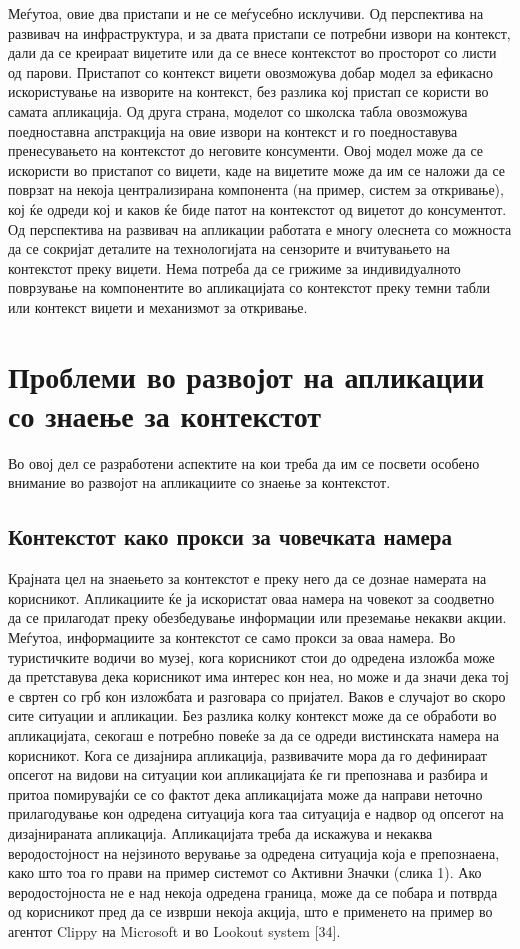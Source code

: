 Меѓутоа, овие два пристапи и не се меѓусебно исклучиви. Од перспектива на
развивач на инфраструктура, и за двата пристапи се потребни извори на контекст,
дали да се креираат виџетите или да се внесе контекстот во просторот со листи од
парови. Пристапот со контекст виџети овозможува добар модел за ефикасно
искористување на изворите на контекст, без разлика кој пристап се користи во
самата апликација. Од друга страна, моделот со школска табла овозможува
поедноставна апстракција на овие извори на контекст и го поедноставува
пренесувањето на контекстот до неговите консументи. Овој модел може да се
искористи во пристапот со виџети, каде на виџетите може да им се наложи да се
поврзат на некоја централизирана компонента (на пример, систем за откривање),
кој ќе одреди кој и каков ќе биде патот на контекстот од виџетот до консументот.
Од перспектива на развивач на апликации работата е многу олеснета со можноста да
се сокријат деталите на технологијата на сензорите и вчитувањето на контекстот
преку виџети. Нема потреба да се грижиме за индивидуалното поврзување на
компонентите во апликацијата со контекстот преку темни табли или контекст виџети
и механизмот за откривање.

\section{Проблеми во развојот на апликации со знаење за контекстот} 

Во овој дел се разработени аспектите на кои треба да им се посвети особено
внимание во развојот на апликациите со знаење за контекстот. 

\subsection{Контекстот како прокси за човечката намера}

Крајната цел на знаењето за контекстот е преку него да се дознае намерата на
корисникот. Апликациите ќе ја искористат оваа намера на човекот за соодветно да
се прилагодат преку обезбедување информации или преземање некакви акции.
Меѓутоа, информациите за контекстот се само прокси за оваа намера. Во
туристичките водичи во музеј, кога корисникот стои до одредена изложба може да
претставува дека корисникот има интерес кон неа, но може и да значи дека тој е
свртен со грб кон изложбата и разговара со пријател. Ваков е случајот во скоро
сите ситуации и апликации. Без разлика колку контекст може да се обработи во
апликацијата, секогаш е потребно повеќе за да се одреди вистинската намера на
корисникот. Кога се дизајнира апликација, развивачите мора да го дефинираат
опсегот на видови на ситуации кои апликацијата ќе ги препознава и разбира и
притоа помирувајќи се со фактот дека апликацијата може да направи неточно
прилагодување кон одредена ситуација кога таа ситуација е надвор од опсегот на
дизајнираната апликација. Апликацијата треба да искажува и некаква
веродостојност на нејзиното верување за одредена ситуација која е препознаена,
како што тоа го прави на пример системот со Активни Значки (слика 1). Ако
веродостојноста не е над некоја одредена граница, може да се побара и потврда од
корисникот пред да се изврши некоја акција, што е применето на пример во агентот
Clippy на Microsoft и во Lookout system [34].

